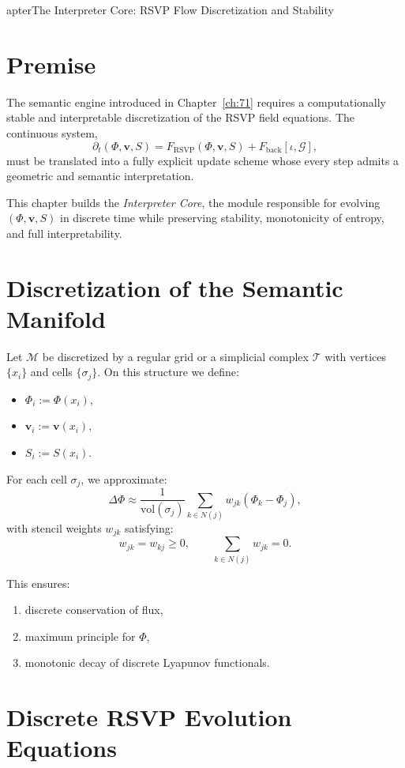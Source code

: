 apter{The Interpreter Core: RSVP Flow Discretization and Stability}
\label{ch:72}

\section{Premise}

The semantic engine introduced in Chapter~\ref{ch:71} requires a
computationally stable and interpretable discretization of the
RSVP field equations.  
The continuous system,
\[
  \partial_t (\Phi,\mathbf{v},S)
    = F_{\mathrm{RSVP}}(\Phi,\mathbf{v},S)
    + F_{\mathrm{back}}[\iota,\mathcal{G}],
\]
must be translated into a fully explicit update scheme whose
every step admits a geometric and semantic interpretation.

This chapter builds the \emph{Interpreter Core},
the module responsible for evolving $(\Phi,\mathbf{v},S)$
in discrete time while preserving stability, monotonicity of entropy,
and full interpretability.

\section{Discretization of the Semantic Manifold}

Let $\mathcal{M}$ be discretized by a regular grid or a simplicial complex
$\mathcal{T}$ with vertices $\{x_i\}$ and cells $\{\sigma_j\}$.
On this structure we define:
\begin{itemize}
\item $\Phi_i := \Phi(x_i)$,
\item $\mathbf{v}_i := \mathbf{v}(x_i)$,
\item $S_i := S(x_i)$.
\end{itemize}

For each cell $\sigma_j$, we approximate:
\[
  \Delta \Phi \approx \frac{1}{\mathrm{vol}(\sigma_j)}
     \sum_{k \in N(j)} w_{jk} (\Phi_k - \Phi_j),
\]
with stencil weights $w_{jk}$ satisfying:
\[
   w_{jk} = w_{kj} \ge 0,
   \qquad
   \sum_{k \in N(j)} w_{jk} = 0.
\]

This ensures:
\begin{enumerate}
\item discrete conservation of flux,
\item maximum principle for $\Phi$,
\item monotonic decay of discrete Lyapunov functionals.
\end{enumerate}

\section{Discrete RSVP Evolution Equations}

